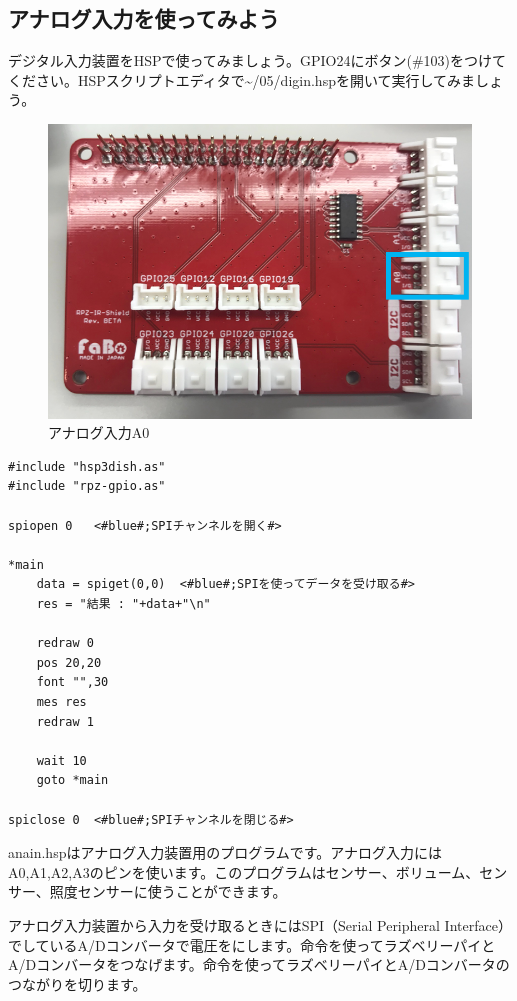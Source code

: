 \subsection{アナログ入力を使ってみよう}
デジタル入力装置をHSPで使ってみましょう。GPIO24にボタン(\#103)をつけてください。HSPスクリプトエディタで\textasciitilde /05/digin.hspを開いて実行してみましょう。\\
\begin{figure}[H]
    \centering
    \includegraphics[scale=0.8]{images/chap05/text05-img030.png}
    \caption{アナログ入力A0}
\end{figure}

\begin{lstlisting}[caption=anain.hsp,label=anain.hsp]
#include "hsp3dish.as"
#include "rpz-gpio.as"

spiopen 0	<#blue#;SPIチャンネルを開く#>

*main
	data = spiget(0,0)	<#blue#;SPIを使ってデータを受け取る#>
	res = "結果 : "+data+"\n"

	redraw 0
	pos 20,20
	font "",30
	mes res
	redraw 1

	wait 10
	goto *main

spiclose 0	<#blue#;SPIチャンネルを閉じる#>
\end{lstlisting}

anain.hspはアナログ入力装置用のプログラムです。アナログ入力にはA0,A1,A2,A3のピンを使います。このプログラムはセンサー、ボリューム、センサー、照度センサーに使うことができます。

アナログ入力装置から入力を受け取るときにはSPI（Serial Peripheral Interface）でしているA/Dコンバータで電圧をにします。命令を使ってラズベリーパイとA/Dコンバータをつなげます。命令を使ってラズベリーパイとA/Dコンバータのつながりを切ります。

